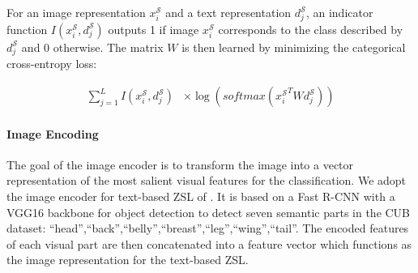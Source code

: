\documentclass[11pt,a4paper]{article}
\newcommand\gal[1]{\textcolor{bright}{\textbf{GAL:} #1 }}
\newcommand\tzuf[1]{\textcolor{blue}{\textbf{TZUF:} #1 }}
\begin{document}

For an image representation $x_i^{\mathcal{S}}$ and a text representation $d^{\mathcal{S}}_j$, an indicator function $I(x_i^{\mathcal{S}},d^{\mathcal{S}}_j)$ outputs 1 if image $x_i^{\mathcal{S}}$ corresponds to the class described by $d^{\mathcal{S}}_j$ and 0 otherwise. 
The matrix $W$ is then learned by minimizing the categorical cross-entropy loss: 


\begin{equation}
\begin{split}
  \sum_{j=1}^{L}I(x_i^{\mathcal{S}},d^{\mathcal{S}}_j) 
  &\times\log(\textit{softmax}({x_i^{\mathcal{S}}}^TWd^{\mathcal{S}}_j))
\end{split}
\end{equation}






\paragraph{Image Encoding}
\label{section:Image_Encoder}
The goal of the image encoder is to transform the image into a vector representation of the most salient visual features for the classification. 
We adopt the image encoder for text-based ZSL of \citet{zhang2016spda, zhu2018generative,elhoseiny2017link}. It is based on a Fast R-CNN with \citep{girshick2015fast} a VGG16 backbone for object detection to detect seven semantic parts in the CUB dataset:
\enquote{head},\enquote{back},\enquote{belly},\enquote{breast},\enquote{leg},\enquote{wing},\enquote{tail}. 
The encoded features of each visual part are then concatenated into a feature vector which functions as the image representation for the text-based ZSL.
\end{document}
